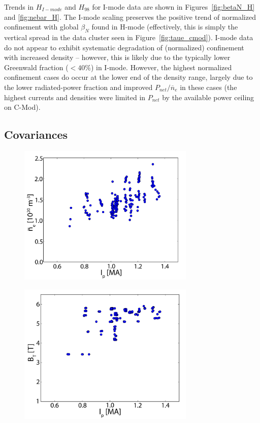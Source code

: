 \documentclass[12pt]{iopart}
\begin{document}
\noindent Trends in $H_{I-mode}$ and $H_{98}$ for I-mode data are shown in Figures~\ref{fig:betaN_H} and \ref{fig:nebar_H}.
The I-mode scaling preserves the positive trend of normalized confinement with global $\beta_N$ found in H-mode (effectively, this is simply the vertical spread in the data cluster seen in Figure~\ref{fig:taue_cmod}).
I-mode data do not appear to exhibit systematic degradation of (normalized) confinement with increased density -- however, this is likely due to the typically lower Greenwald fraction ($<40\%$) in I-mode.
However, the highest normalized confinement cases do occur at the lower end of the density range, largely due to the lower radiated-power fraction and improved $P_{net}/\overline{n}_e$ in these cases (the highest currents and densities were limited in $P_{net}$ by the available power ceiling on C-Mod).

\subsection{Covariances}\label{subsec:covar}

\begin{figure}[ht]
 \centering
 \includegraphics[width=0.75\textwidth]{Ip_nebar.pdf}
 \caption{}
 \label{fig:Ip_nebar}
\end{figure}

\begin{figure}[ht]
 \centering
 \includegraphics[width=0.75\textwidth]{Ip_Bt.pdf}
 \caption{}
 \label{fig:Ip_Bt}
\end{figure}
\end{document}
